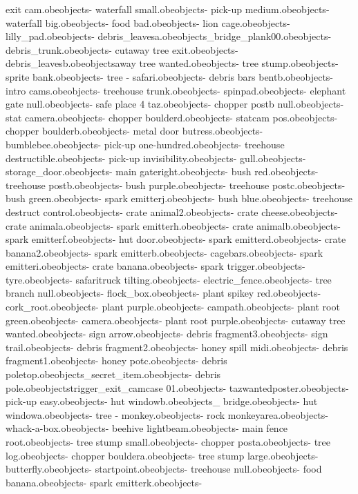 exit cam.obe objects\bank - waterfall small.obe objects\bank - pick-up medium.obe objects\bank - waterfall big.obe objects\bank - food bad.obe objects\bank - lion cage.obe objects\bank - lilly_pad.obe objects\bank - debris_leavesa.obe objects\bank_bridge_plank00.obe objects\bank - debris_trunk.obe objects\bank - cutaway tree exit.obe objects\bank - debris_leavesb.obe objects\cut away tree wanted.obe objects\bank - tree stump.obe objects\bank - sprite bank.obe objects\bank - tree - safari.obe objects\bank - debris bars bentb.obe objects\bank - intro cams.obe objects\bank - treehouse trunk.obe objects\bank - spinpad.obe objects\bank - elephant gate null.obe objects\bank - safe place 4 taz.obe objects\bank - chopper postb null.obe objects\bank - stat camera.obe objects\bank - chopper boulderd.obe objects\bank - statcam pos.obe objects\bank - chopper boulderb.obe objects\bank - metal door butress.obe objects\bank - bumblebee.obe objects\bank - pick-up one-hundred.obe objects\bank - treehouse destructible.obe objects\bank - pick-up invisibility.obe objects\bank - gull.obe objects\bank - storage_door.obe objects\bank - main gateright.obe objects\bank - bush red.obe objects\bank - treehouse postb.obe objects\bank - bush purple.obe objects\bank - treehouse postc.obe objects\bank - bush green.obe objects\bank - spark emitterj.obe objects\bank - bush blue.obe objects\bank - treehouse destruct control.obe objects\bank - crate animal2.obe objects\bank - crate cheese.obe objects\bank - crate animala.obe objects\bank - spark emitterh.obe objects\bank - crate animalb.obe objects\bank - spark emitterf.obe objects\bank - hut door.obe objects\bank - spark emitterd.obe objects\bank - crate banana2.obe objects\bank - spark emitterb.obe objects\bank - cagebars.obe objects\bank - spark emitteri.obe objects\bank - crate banana.obe objects\bank - spark trigger.obe objects\bank - tyre.obe objects\bank - safaritruck tilting.obe objects\bank - electric_fence.obe objects\bank - tree branch null.obe objects\bank - flock_box.obe objects\bank - plant spikey red.obe objects\bank - cork_root.obe objects\bank - plant purple.obe objects\bank - campath.obe objects\bank - plant root green.obe objects\bank - camera.obe objects\bank - plant root purple.obe objects\bank - cutaway tree wanted.obe objects\bank - sign arrow.obe objects\bank - debris fragment3.obe objects\bank - sign trail.obe objects\bank - debris fragment2.obe objects\bank - honey spill midi.obe objects\bank - debris fragment1.obe objects\bank - honey potc.obe objects\bank - debris poletop.obe objects\bank_secret_item.obe objects\bank - debris pole.obe objects\bank trigger_exit_camcase 01.obe objects\bank - tazwantedposter.obe objects\bank - pick-up easy.obe objects\bank - hut windowb.obe objects\bank _ bridge.obe objects\bank - hut windowa.obe objects\bank - tree - monkey.obe objects\bank - rock monkeyarea.obe objects\bank - whack-a-box.obe objects\bank - beehive lightbeam.obe objects\bank - main fence root.obe objects\bank - tree stump small.obe objects\bank - chopper posta.obe objects\bank - tree log.obe objects\bank - chopper bouldera.obe objects\bank - tree stump large.obe objects\bank - butterfly.obe objects\bank - startpoint.obe objects\bank - treehouse null.obe objects\bank - food banana.obe objects\bank - spark emitterk.obe objects\bank - 